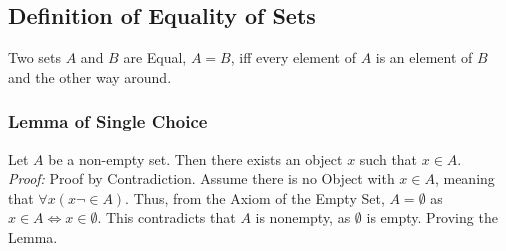 \documentclass[]{scrbook}
\begin{document}
\subsection{Definition of Equality of Sets}

Two sets $A$ and $B$ are Equal, $A=B$, iff every element of $A$ is an element of $B$ and the other way around.

\subsubsection{Lemma of Single Choice}
Let $A$ be a non-empty set. Then there exists an object $x$ such that $x\in A$.\\
\textit{Proof:} Proof by Contradiction. Assume there is no Object with $x\in A$, meaning that $\forall x(x\neg\in A)$. Thus, from the Axiom of the Empty Set, $A = \emptyset$ as $x\in A \Leftrightarrow x\in\emptyset$. This contradicts that $A$ is nonempty, as $\emptyset$ is empty. Proving the Lemma.
\end{document}
